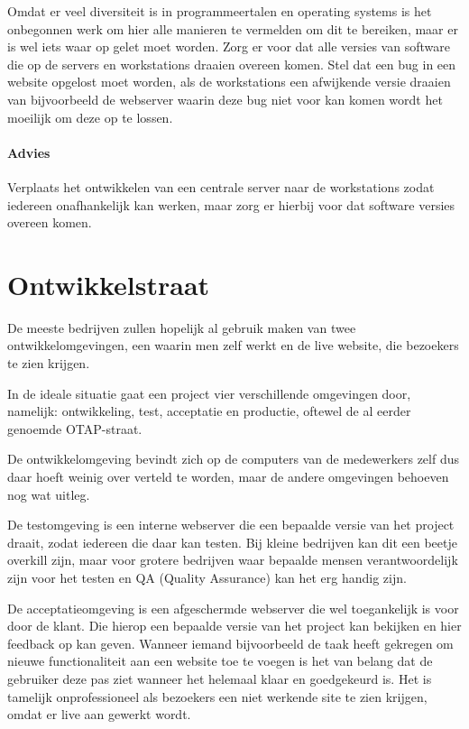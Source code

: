 Omdat er veel diversiteit is in programmeertalen en operating systems is het onbegonnen werk om hier alle manieren te vermelden om dit te bereiken, maar er is wel iets waar op gelet moet worden. Zorg er voor dat alle versies van software die op de servers en workstations draaien overeen komen. Stel dat een bug in een website opgelost moet worden, als de workstations een afwijkende versie draaien van bijvoorbeeld de webserver waarin deze bug niet voor kan komen wordt het moeilijk om deze op te lossen.

\paragraph{Advies} Verplaats het ontwikkelen van een centrale server naar de workstations zodat iedereen onafhankelijk kan werken, maar zorg er hierbij voor dat software versies overeen komen.

\section{Ontwikkelstraat}

De meeste bedrijven zullen hopelijk al gebruik maken van twee ontwikkelomgevingen, een waarin men zelf werkt en de live website, die bezoekers te zien krijgen.

In de ideale situatie gaat een project vier verschillende omgevingen door, namelijk: ontwikkeling, test, acceptatie en productie, oftewel de al eerder genoemde OTAP-straat. 

De ontwikkelomgeving bevindt zich op de computers van de medewerkers zelf dus daar hoeft weinig over verteld te worden, maar de andere omgevingen behoeven nog wat uitleg.

De testomgeving is een interne webserver die een bepaalde versie van het project draait, zodat iedereen die daar kan testen. Bij kleine bedrijven kan dit een beetje overkill zijn, maar voor grotere bedrijven waar bepaalde mensen verantwoordelijk zijn voor het testen en QA (Quality Assurance) kan het erg handig zijn.

De acceptatieomgeving is een afgeschermde webserver die wel toegankelijk is voor door de klant. Die hierop een bepaalde versie van het project kan bekijken en hier feedback op kan geven. Wanneer iemand bijvoorbeeld de taak heeft gekregen om nieuwe functionaliteit aan een website toe te voegen is het van belang dat de gebruiker deze pas ziet wanneer het helemaal klaar en goedgekeurd is. Het is tamelijk onprofessioneel als bezoekers een niet werkende site te zien krijgen, omdat er live aan gewerkt wordt.

